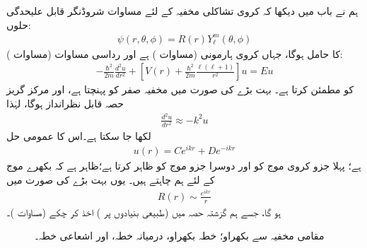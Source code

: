 ہم نے باب    میں دیکھا کہ کروی تشاکلی مخفیہ  کے لئے مساوات شروڈنگر قابل علیحدگی حلوں:
\begin{align}
	\psi(r, \theta, \phi) = R(r)Y^m_{\ell}(\theta, \phi)
\end{align}
کا حامل ہوگا،  جہاں  کروی ہارمونی  (مساوات )   ہے اور  رداسی مساوات (مساوات ):
\begin{align}
	-\frac{\hbar^2}{2m}\frac{d^2u}{dr^2}+\left[V(r)+\frac{\hbar^2}{2m}\frac{\ell(\ell+1)}{r^2}\right]u = Eu
\end{align}
کو مطمئن  کرتا ہے۔ بہت بڑے   کی صورت میں مخفیہ صفر کو پہنچتا ہے،  اور مرکز گریز حصہ قابل نظرانداز ہوگا،  لہٰذا 
\begin{align*}
	\frac{d^2u}{dr^2} \approx-k^2u
\end{align*}
لکھا جا سکتا ہے۔اس کا عمومی حل
\begin{align*}
	u(r) = Ce^{ikr}+De^{-ikr}
\end{align*}
ہے؛ پہلا جزو     کروی موج کو اور دوسرا جزو   موج کو ظاہر کرتا ہے؛ظاہر ہے کہ  بکھرے    موج   کے لئے ہم  چاہتے ہیں۔ یوں بہت بڑے   کی صورت میں
\begin{align*}
	R(r)\sim\frac{e^{ikr}}{r}
\end{align*}
ہو گا، جسے  ہم گزشتہ حصہ میں  (طبیعی بنیادوں  پر )  اخذ  کر چکے  (مساوات   )۔

\begin{figure}
\centering
{}
\caption{مقامی مخفیہ سے بکھراو؛ خطہ بکھراو، درمیانہ خطہ، اور اشعاعی خطہ۔}
\label{شکل_بکھراو_تین_خطے}
\end{figure}


